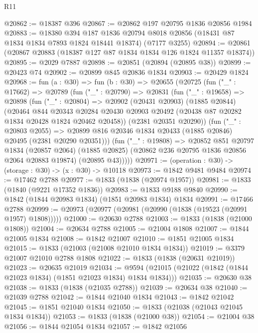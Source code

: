 \begin{lexlean}{R11}
\begin{coremodule}
@20862 := @18387 @396
@20867 := @20862 @197 @20795 @1836 @20856 @1984
@20883 := @18380
    @394
    @187
    @1836
    @20794
    @8018
    @20856
    (@18431 @87 @1834 @1834 @7893 @1824 @18441 @18374)
    (@7177 @3255)
@20894 := @20861 (@20867 @20883 (@18387 @127 @87 @1834 @1834 @126 @1824 @11357 @18374))
@20895 := @2029 @7887
@20898 := @20851 (@20894 (@20895 @38))
@20899 := @20423 @74
@20902 := @20899 @845 @20836 @1834
@20903 := @20429 @1824
@20968 := fun (a : @30) =>
  fun (b : @30) =>
  @20655
    (@20725
      (fun ("_" : @17662) =>
      @20789
        (fun ("_" : @20790) =>
        @20831
          (fun ("_" : @19658) =>
          @20898
            (fun ("_" : @20804) =>
            @20902
              (@20431 @20903)
              (@1885 @20844)
              (@20464
                @844
                @20343
                @20284
                @20430
                @20903
                @20492
                (@20438 @87 @20282 @1834 @20428 @1824 @20462 @20458))
              (@2381 @20351 @20290))
            (fun ("_" : @20803 @2055) =>
            @20899 @816 @20346 @1834 @20433 (@1885 @20846) @20495 (@2381 @20290 @20351)))
          (fun ("_" : @19808) =>
          @20852
            @851
            @20797
            @1834
            (@20857 @2064)
            (@1885 @20825)
            (@20862 @236 @20795 @1836 @20856 @2064 @20883 @19874)
            (@20895 @43)))))
@20971 := (operation : @30) -> (storage : @30) -> (x : @30) -> @10118
@20973 := @1842 @9481 @9484
@20974 := @17462 @2788
@20977 := @1833 (@1838 (@20974 @1957))
@20981 := @1833 (@1840 (@9221 @17352 @1836))
@20983 := @1833 @9188 @9840
@20990 := @1842 (@1844 @20983 @1834) (@1851 @20983 @1834) @1834
@20991 := @17466 @2788
@20999 := @20973 (@20977 (@20981 (@20990 (@1838 (@19523 (@20991 @1957) @1808)))))
@21000 := @20630 @2788
@21003 := @1833 (@1838 (@21000 @1808))
@21004 := @20634 @2788
@21005 := @21004 @1808
@21007 := @1844 @21005 @1834
@21008 := @1842 @21007
@21010 := @1851 @21005 @1834
@21015 := @1833 (@21003 (@21008 @21010 @1834 @1834))
@21019 := @3379 @21007 @21010 @2788 @1808
@21022 := @1833 (@1838 (@20631 @21019))
@21023 := @20635 @21019
@21034 := @9594 (@21015 (@21022 (@1842 (@1844 @21023 @1834) (@1851 @21023 @1834) @1834 @1834)))
@21035 := @20630 @38
@21038 := @1833 (@1838 (@21035 @2788))
@21039 := @20634 @38
@21040 := @21039 @2788
@21042 := @1844 @21040 @1834
@21043 := @1842 @21042
@21045 := @1851 @21040 @1834
@21050 := @1833 (@21038 (@21043 @21045 @1834 @1834))
@21053 := @1833 (@1838 (@21000 @38))
@21054 := @21004 @38
@21056 := @1844 @21054 @1834
@21057 := @1842 @21056

\end{coremodule}
\end{lexlean}
